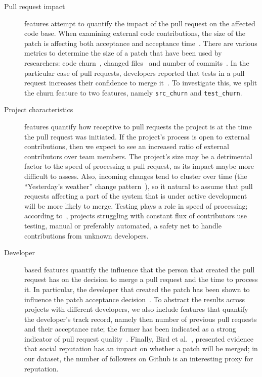 \documentclass{sig-alternate}
\begin{document}
\begin{description}

  \item[Pull request impact] features attempt to quantify the impact of the
    pull request on the affected code base. When examining external code
    contributions, the size of the patch is affecting both acceptance and
    acceptance time~\cite{Weiss08}. There are various metrics to determine the
    size of a patch that have been used by researchers: code
    churn~\cite{Nagap05, Ratzi07}, changed files~\cite{Nagap05} and number of
    commits~\cite{Fluri07}. In the particular case of pull requests, developers
    reported that tests in a pull request increases their confidence to merge
    it~\cite{Pham13}. To investigate this, we split the churn feature to two
    features, namely \texttt{src\_churn} and \texttt{test\_churn}.

  \item[Project characteristics] features quantify how receptive to pull
    requests the project is at the time the pull request was initiated.
    If the project's process is open to external contributions, then
    we expect to see an increased ratio of external contributors over
    team members. The project's size may be a detrimental
    factor to the speed of processing a pull request, as its impact maybe
    more difficult to assess.
    Also, incoming changes tend to cluster over time (the ``Yesterday's
    weather'' change pattern~\cite{Girba04}), so it natural to assume
    that pull requests affecting a part of the system that is under
    active development will be more likely to merge.
    Testing plays a role in speed of processing; according
    to~\cite{Pham13}, projects struggling with constant flux of contributors 
    use testing, manual or preferably automated, a safety net to handle
    contributions from unknown developers.

  \item[Developer] based features quantify the influence that the person that
    created the pull request has on the decision to merge a pull request and
    the time to process it. In particular, the developer that created the patch
    has been shown to influence the patch acceptance decision~\cite{Jeong09}. To
    abstract the results across projects with different developers, we also
    include features that quantify the developer's track record, namely then
    number of previous pull requests and their acceptance rate; the former has
    been indicated as a strong indicator of pull request quality~\cite{Pham13}.
    Finally, Bird et al.~\cite{Bird07}, presented evidence that social
    reputation has an impact on whether a patch will be merged; in our dataset,
    the number of followers on Github is an interesting proxy for
    reputation.
\end{description}
\end{document}
